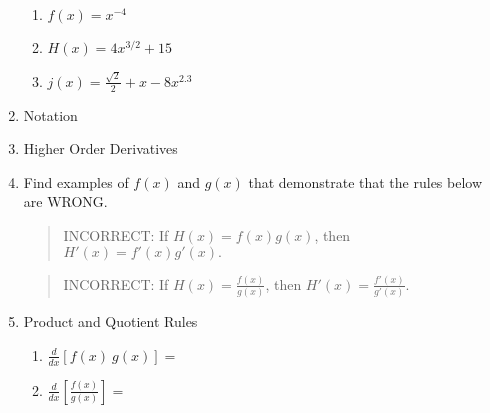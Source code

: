 \documentclass[11pt,fleqn]{article}
\begin{document}
\begin{enumerate}
\begin{enumerate}
	\item $\displaystyle{f(x)=x^{-4}}$\\
		\vfill

	\item $\displaystyle{H(x)=4x^{3/2}+ 15}$\\
	\vfill

	\item $\displaystyle{j(x)=\frac{\sqrt{2}}{2}+x-8x^{2.3}}$\\
	\vfill

	\end{enumerate}
\item Notation\\
\vfill
\item Higher Order Derivatives
\vfill
\newpage
\item Find examples of $f(x)$ and $g(x)$ that demonstrate that the rules below are WRONG.\\
\begin{quote} INCORRECT: If $H(x)=f(x)g(x)$, then $H'(x)=f'(x)g'(x).$ \end{quote}
\vfill

\begin{quote} INCORRECT: If $H(x)=\frac{f(x)}{g(x)}$, then $H'(x)=\frac{f'(x)}{g'(x)}.$ \end{quote}
\vfill

\item Product and Quotient Rules\\
	
	\begin{enumerate}
	\item $\displaystyle{\frac{d}{dx}\left[f(x)\: g(x)\right]=}$\\
	\vfill

	\item $\displaystyle{\frac{d}{dx}\left[\frac{f(x)}{g(x)}\right]=}$\\
	\vfill
	\end{enumerate}

\end{enumerate}
\end{document}
